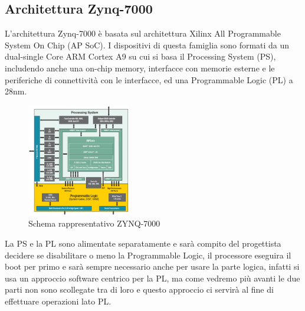 \subsection{Architettura Zynq-7000}
L'architettura Zynq-7000 è basata sul architettura Xilinx All Programmable System On Chip (AP SoC). I dispositivi di questa famiglia sono formati da un dual-single Core ARM Cortex A9 su cui si basa il Processing System (PS), includendo anche una on-chip memory, interfacce con memorie esterne e le periferiche di connettività con le interfacce, ed una Programmable Logic (PL) a 28nm.
\begin{figure}[h]
\centering
\includegraphics[width=0.4\textwidth]{images/zynq_arch.png}
\caption{Schema rappresentativo ZYNQ-7000\cite{Zynq-7000}}
\end{figure}\clearpage
La PS e la PL sono alimentate separatamente e sarà compito del progettista decidere se disabilitare o meno la Programmable Logic, il processore eseguira il boot per primo e sarà sempre necessario anche per usare la parte logica, infatti si usa un approccio software centrico per la PL, ma come vedremo più avanti le due parti non sono scollegate tra di loro e questo approccio ci servirà al fine di effettuare operazioni lato PL.
